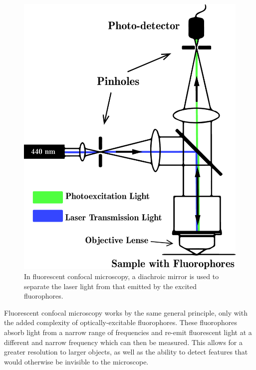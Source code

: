 \begin{figure}
	
	\centering
\includegraphics[width=\linewidth]{Chapters/Figures/confocal_fluorescent_diagram_b}
\caption[Fluorescent Confocal Microscopy]{In fluorescent confocal microscopy, a diachroic mirror is used to separate the laser light from that emitted by the excited fluorophores. }
\label{fig:confocalfluorescentdiagram}
	
	
\end{figure}
	
Fluorescent confocal microscopy works by the same general principle, only with the added complexity of optically-excitable fluorophores. These fluorophores absorb light from a narrow range of frequencies and re-emit fluorescent light at a different and narrow frequency which can then be measured. This allows for a greater resolution to larger objects, as well as the ability to detect features that would otherwise be invisible to the microscope.  


